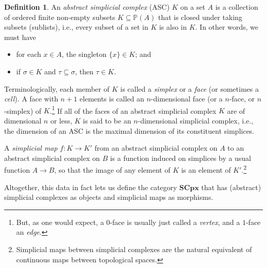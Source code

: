 \documentclass[11pt]{book}
\theoremstyle{definition}
\theoremstyle{definition}
\newtheorem{definition}{Definition}[section]
\theoremstyle{definition}
\theoremstyle{theorem}
\theoremstyle{definition}
\begin{document}
	\begin{definition}
		An \textit{abstract simplicial complex} (ASC) $K$ on a set $A$ is a collection of ordered finite non-empty subsets $K \subseteq  \mathbb{P}(A)$ that is closed under taking subsets (sublists), i.e., every subset of a set in $K$ is also in $K$. In other words, we must have 
		\begin{itemize}
			\item for each $x \in A$, the singleton $\{x\} \in K$; and 
			\item if $\sigma \in K$ and $\tau \subseteq  \sigma$, then $\tau \in K$. 
		\end{itemize}\par \noindent 
		Terminologically, each member of $K$ is called a \textit{simplex} or a \textit{face} (or sometimes a \textit{cell}). A face with $n+1$ elements is called an $n$-dimensional face (or a $n$-face, or $n$-simplex) of $K$.\footnote{But, as one would expect, a $0$-face is usually just called a \textit{vertex}, and a $1$-face an \textit{edge}.} If all of the faces of an abstract simplicial complex $K$ are of dimensional $n$ or less, $K$ is said to be an $n$-dimensional simplicial complex, i.e., the dimension of an ASC is the maximal dimension of its constituent simplices.\par
		A \textit{simplicial map} $f: K \rightarrow K'$ from an abstract simplicial complex on $A$ to an abstract simplicial complex on $B$ is a function induced on simplices by a usual function $A \rightarrow B$, so that the image of any element of $K$ is an element of $K'$.\footnote{Simplicial maps between simplicial complexes are the natural equivalent of continuous maps between topological spaces.} \par 
		Altogether, this data in fact lets us define the category $\textbf{SCpx}$ that has (abstract) simplicial complexes as objects and simplicial maps as morphisms.
	\end{definition} 
\end{document}
